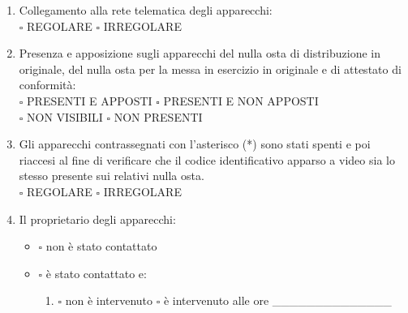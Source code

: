 \documentclass[12pt]{article}
\begin{document}
\begin{enumerate}[resume]
    \item Collegamento alla rete telematica degli apparecchi:
    \\\begin{math}\square\end{math} REGOLARE \begin{math}\square\end{math} IRREGOLARE
    \item Presenza e apposizione sugli apparecchi del nulla osta di distribuzione in originale, del nulla osta per la messa in esercizio in originale e di attestato di conformità:
    \\\begin{math} \square\end{math} PRESENTI E APPOSTI \begin{math}\square\end{math} PRESENTI E NON APPOSTI
    \\\begin{math}\square\end{math} NON VISIBILI \begin{math}\square\end{math} NON PRESENTI
    \item Gli apparecchi contrassegnati con l’asterisco (*) sono stati spenti e poi riaccesi al fine di verificare che il codice identificativo apparso a video sia lo stesso presente sui relativi nulla osta.
    \\\begin{math} \square\end{math} REGOLARE \begin{math}\square\end{math} IRREGOLARE
    \item Il proprietario degli apparecchi:
    \begin{itemize}[label={}]
        \item \begin{math}\square\end{math} non è stato contattato
        \item \begin{math}\square\end{math} è stato contattato e:
        \begin{enumerate}[]
            \item \begin{math}\square\end{math} non è intervenuto \begin{math}\square\end{math} è intervenuto alle ore \_\_\_\_\_\_\_\_\_\_\_\_\_\_

\end{enumerate}
\end{itemize}
\end{enumerate}
\end{document}
